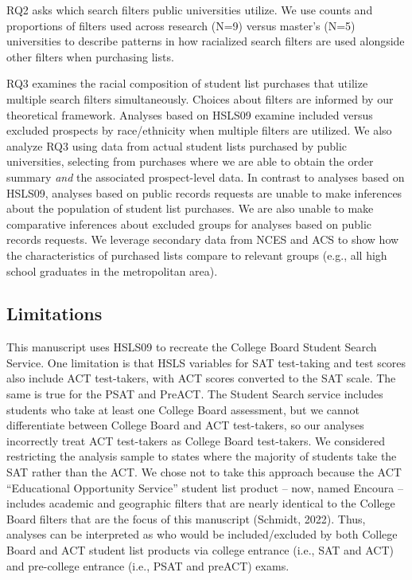 \documentclass[
  12pt,
]{article}
\begin{document}
RQ2 asks which search filters public universities utilize. We use counts and proportions of filters used across research (N=9) versus master's (N=5) universities to describe patterns in how racialized search filters are used alongside other filters when purchasing lists.

RQ3 examines the racial composition of student list purchases that utilize multiple search filters simultaneously. Choices about filters are informed by our theoretical framework. Analyses based on HSLS09 examine included versus excluded prospects by race/ethnicity when multiple filters are utilized. We also analyze RQ3 using data from actual student lists purchased by public universities, selecting from purchases where we are able to obtain the order summary \emph{and} the associated prospect-level data. In contrast to analyses based on HSLS09, analyses based on public records requests are unable to make inferences about the population of student list purchases. We are also unable to make comparative inferences about excluded groups for analyses based on public records requests. We leverage secondary data from NCES and ACS to show how the characteristics of purchased lists compare to relevant groups (e.g., all high school graduates in the metropolitan area).

\hypertarget{limitations}{%
\subsection{Limitations}\label{limitations}}

This manuscript uses HSLS09 to recreate the College Board Student Search Service. One limitation is that HSLS variables for SAT test-taking and test scores also include ACT test-takers, with ACT scores converted to the SAT scale. The same is true for the PSAT and PreACT. The Student Search service includes students who take at least one College Board assessment, but we cannot differentiate between College Board and ACT test-takers, so our analyses incorrectly treat ACT test-takers as College Board test-takers. We considered restricting the analysis sample to states where the majority of students take the SAT rather than the ACT. We chose not to take this approach because the ACT ``Educational Opportunity Service'' student list product -- now, named Encoura -- includes academic and geographic filters that are nearly identical to the College Board filters that are the focus of this manuscript (Schmidt, 2022). Thus, analyses can be interpreted as who would be included/excluded by both College Board and ACT student list products via college entrance (i.e., SAT and ACT) and pre-college entrance (i.e., PSAT and preACT) exams.
\end{document}
